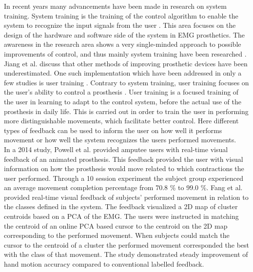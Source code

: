 In recent years many advancements have been made in research on system training. System training is the training of the control algorithm to enable the system to recognize the input signals from the user \cite{Fougner2012}. This area focuses on the design of the hardware and software side of the system in EMG prosthetics. %
The awareness in the research area shows a very single-minded approach to possible improvements of control, and thus mainly system training have been researched \cite{Jiang2012}. Jiang et al. \cite{Jiang2012} discuss that other methods of improving prosthetic devices have been underestimated. One such implementation which have been addressed in only a few studies is user training \cite{Powell2014, Fang2017, Pan2017}. Contrary to system training, user training focuses on the user's ability to control a prosthesis \cite{Fougner2012}. User training is a focused training of the user in learning to adapt to the control system, before the actual use of the prosthesis in daily life. This is carried out in order to train the user in performing more distinguishable movements, which facilitate better control. Here different types of feedback can be used to inform the user on how well it performs movement or how well the system recognizes the users performed movements. \cite{Powell2014, Simon2013} \\
In a 2014 study, Powell et al. \cite{Powell2014} provided amputee users with real-time visual feedback of an animated prosthesis. This feedback provided the user with visual information on how the prosthesis would move related to which contractions the user performed. Through a 10 session experiment the subject group experienced an average movement completion percentage from 70.8 \% to 99.0 \%. %
Fang et al. \cite{Fang2017} provided real-time visual feedback of subjects' performed movement in relation to the classes defined in the system. The feedback visualized a 2D map of cluster centroids based on a PCA of the EMG. The users were instructed in matching the centroid of an online PCA based cursor to the centroid on the 2D map corresponding to the performed movement. When subjects could match the cursor to the centroid of a cluster the performed movement corresponded the best with the class of that movement. The study demonstrated steady improvement of hand motion accuracy compared to conventional labelled feedback. \cite{Fang2017} %

